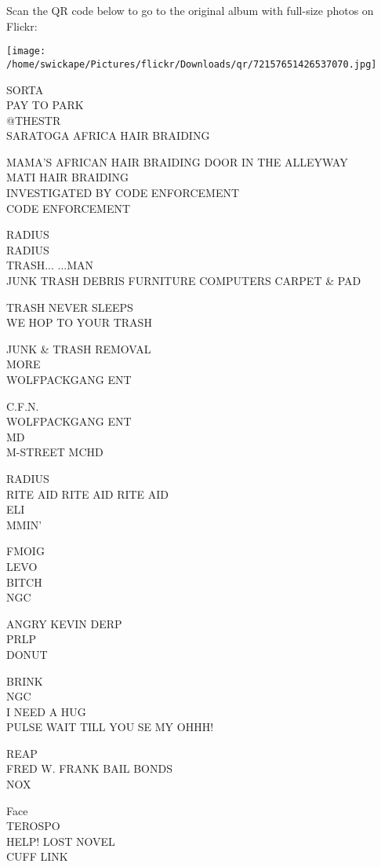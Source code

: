 \documentclass[10pt,letterpaper]{article}
\begin{document}
Scan the QR code below to go to the original album with full-size photos on Flickr:

\texttt{[image: /home/swickape/Pictures/flickr/Downloads/qr/72157651426537070.jpg]}
\pagebreak

SORTA\\
PAY TO PARK\\
@THESTR\\
SARATOGA AFRICA HAIR BRAIDING

MAMA'S AFRICAN HAIR BRAIDING DOOR IN THE ALLEYWAY\\
MATI HAIR BRAIDING\\
INVESTIGATED BY CODE ENFORCEMENT\\
CODE ENFORCEMENT

RADIUS\\
RADIUS\\
TRASH... ...MAN\\
JUNK TRASH DEBRIS FURNITURE COMPUTERS CARPET \& PAD

TRASH NEVER SLEEPS\\
WE HOP TO YOUR TRASH

JUNK \& TRASH REMOVAL\\
MORE\\
WOLFPACKGANG ENT

C.F.N.\\
WOLFPACKGANG ENT\\
MD\\
M{-}STREET MCHD

RADIUS\\
RITE AID RITE AID RITE AID\\
ELI\\
MMIN'

FMOIG\\
LEVO\\
BITCH\\
NGC

ANGRY KEVIN DERP\\
PRLP\\
DONUT

BRINK\\
NGC\\
I NEED A HUG\\
PULSE WAIT TILL YOU SE MY OHHH!

REAP\\
FRED W. FRANK BAIL BONDS\\
NOX

Face\\
TEROSPO\\
HELP!  LOST NOVEL\\
CUFF LINK
\end{document}
